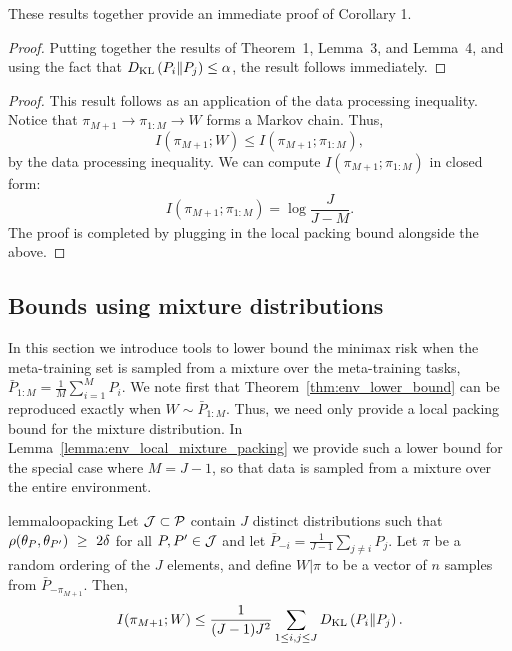 These results together provide an immediate proof of Corollary 1.

\envlboundpacking*

\begin{proof}
Putting together the results of Theorem~1, Lemma~3, and Lemma~4, and using the fact that $D_{\mathrm{KL}}\left(P_i\Vert P_j\right) \leq \alpha$, the result follows immediately.
\end{proof}

\envlboundasymp*

\begin{proof}
This result follows as an application of the data processing inequality. Notice that $\pi_{M+1} \rightarrow \pi_{1:M} \rightarrow W$ forms a Markov chain. Thus,
\[I(\pi_{M+1};W) \leq I(\pi_{M+1};\pi_{1:M}),\]
by the data processing inequality. We can compute $I(\pi_{M+1};\pi_{1:M})$ in closed form:
\[I(\pi_{M+1};\pi_{1:M}) = \log \frac{J}{J-M}.\]
The proof is completed by plugging in the \iid local packing bound alongside the above.
\end{proof}

\subsection{Bounds using mixture distributions}\label{app:mixture_lbounds}

In this section we introduce tools to lower bound the minimax risk when the meta-training set is sampled from a mixture over the meta-training tasks, $\bar{P}_{1:M} = \frac{1}{M}\sum_{i=1}^{M} P_i$. We note first that Theorem~\ref{thm:env_lower_bound} can be reproduced exactly when $W \sim \bar{P}_{1:M}$. Thus, we need only provide a local packing bound for the mixture distribution. In Lemma~\ref{lemma:env_local_mixture_packing} we provide such a lower bound for the special case where $M = J-1$, so that data is sampled from a mixture over the entire environment.

\begin{restatable}{lemma}{loopacking}\label{lemma:env_local_mixture_packing}
Let $\mathcal{J} \subset \mathcal{P}$ contain $J$ distinct distributions such that $\rho(\theta_{P}, \theta_{P'})~\geq~2\delta$ for all $P,P' \in \mathcal{J}$ and let $\bar{P}_{-i} = \frac{1}{J-1} \sum_{j \neq i} P_j$. Let $\pi$ be a random ordering of the $J$ elements, and define $W|\pi$ to be a vector of $n$ \iid samples from $\bar{P}_{-\pi_{M+1}}$. Then,
\[I(\pi_{M+1}; W) \le \frac{1}{(J-1)J^2} \sum_{1 \le i,j \le J} D_{\mathrm{KL}}\left(P_i\Vert P_j\right).\]
\end{restatable}

